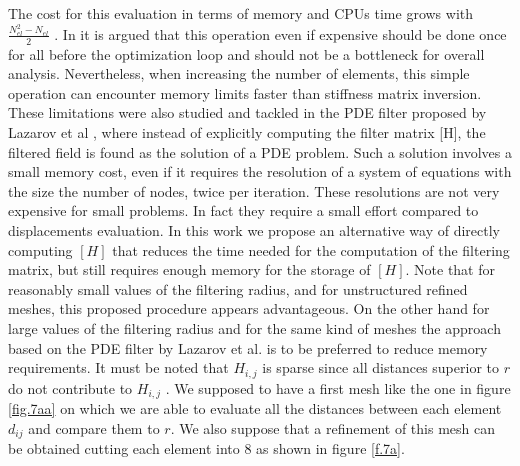   The cost for this evaluation in terms of memory and CPUs time grows with $\frac{N_{el}^2-N_{el}}{2}$ . In \cite{talischi2012polytop} it is argued that this operation even if  expensive should be done once for all before the optimization loop and should not be a bottleneck for overall analysis. Nevertheless, when increasing the number of elements, this simple operation can encounter memory limits faster than stiffness matrix inversion. These limitations were also studied and tackled in the PDE filter proposed by Lazarov et al \cite{lazarov2011filters}, where instead of explicitly computing the filter matrix [H], the filtered field is found as the solution of a PDE problem. Such a solution involves a small memory cost, even if it requires the resolution of a system of equations with the size the number of nodes, twice per iteration. These resolutions are not very expensive for small problems. In fact they require a small effort compared to displacements evaluation. In this work we propose an alternative way of directly computing $\left[ H \right]$ that reduces the time needed for the computation of the filtering matrix, but still requires enough memory for the storage of $\left[ H \right]$. Note that for reasonably small values of the filtering radius, and for unstructured refined meshes, this proposed procedure appears advantageous. On the other hand for large values of the filtering radius and for the same kind of meshes the approach based on the PDE filter by Lazarov et al. \cite{lazarov2011filters} is to be preferred to reduce memory requirements. 
  It must be noted that $H_{i,j}$ is sparse since all distances superior to $r$ do not contribute to $H_{i,j}$ . We supposed to have a first mesh like the one in figure \ref{fig.7aa} on which we are able to evaluate all the distances between each element $d_{ij}$ and compare them to $r$. We also suppose that a refinement of this mesh can be obtained cutting each element into 8 as shown in figure \ref{f.7a}.
